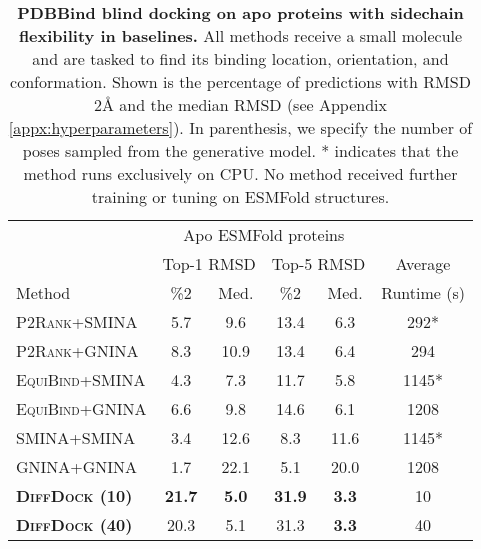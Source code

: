 \documentclass{article} \usepackage{iclr2023_conference,times}
\begin{document}
\begin{table}[htb]
    \caption{\textbf{PDBBind blind docking on apo proteins with sidechain flexibility in baselines.} All methods receive a small molecule and are tasked to find its binding location, orientation, and conformation. Shown is the percentage of predictions with RMSD  2\AA{} and the median RMSD (see Appendix \ref{appx:hyperparameters}). In parenthesis, we specify the number of poses sampled from the generative model. * indicates that the method runs exclusively on CPU. No method received further training or tuning on ESMFold structures.}
    \label{tab:sidechain_flex_baselines}
     \begin{small}
     \begin{center}

    \begin{tabular}{lcc|cc|c}
    \toprule
      & \multicolumn{4}{c}{Apo ESMFold proteins} & \\ \rule{0pt}{2ex}
      
       & \multicolumn{2}{c}{Top-1 RMSD} & \multicolumn{2}{c}{Top-5 RMSD} & Average\\ \rule{0pt}{2ex}  
    
        Method  & \%2 & Med. &  \%2 & Med.  &  Runtime (s)  \\
    \midrule
    \textsc{P2Rank+SMINA}        & 5.7 & 9.6  & 13.4 & 6.3 & 292* \\ 
    \textsc{P2Rank+GNINA}        & 8.3 & 10.9  & 13.4 &  6.4 & 294 \\ 
    \textsc{EquiBind+SMINA}      & 4.3 & 7.3  & 11.7 & 5.8 & 1145* \\
    \textsc{EquiBind+GNINA}      & 6.6 & 9.8  & 14.6 & 6.1 & 1208   \\ 
    \textsc{SMINA+SMINA}      & 3.4 & 12.6  & 8.3 & 11.6 & 1145*  \\
    \textsc{GNINA+GNINA}      & 1.7 & 22.1  & 5.1 & 20.0 & 1208    \\ \midrule
    \textbf{\textsc{DiffDock} (10)}    & \textbf{21.7} & \textbf{5.0}  & \textbf{31.9} & \textbf{3.3} &  10     \\
    \textbf{\textsc{DiffDock} (40)}    & 20.3 & 5.1  & 31.3 & \textbf{3.3} & 40      \\
    \bottomrule
    \end{tabular}
    \end{center}
    \end{small}
\vspace{-12pt}
\end{table}
\end{document}
